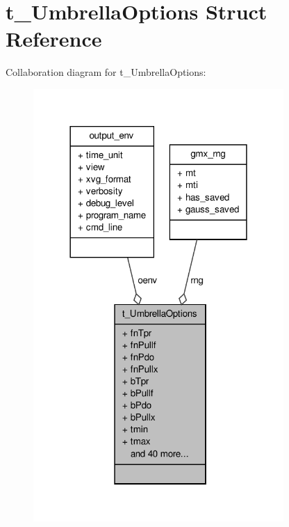 \hypertarget{structt__UmbrellaOptions}{\section{t\-\_\-\-Umbrella\-Options \-Struct \-Reference}
\label{structt__UmbrellaOptions}
}


\-Collaboration diagram for t\-\_\-\-Umbrella\-Options\-:
\nopagebreak
\begin{figure}[H]
\begin{center}
\leavevmode
\includegraphics[width=270pt]{structt__UmbrellaOptions__coll__graph}
\end{center}
\end{figure}
